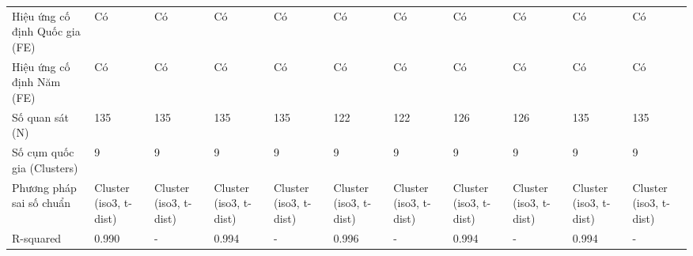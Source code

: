 \begin{table}
\begin{tabular}{lllllllllll}
Hiệu ứng cố định Quốc gia (FE) & Có & Có & Có & Có & Có & Có & Có & Có & Có & Có \\
Hiệu ứng cố định Năm (FE) & Có & Có & Có & Có & Có & Có & Có & Có & Có & Có \\
Số quan sát (N) & 135 & 135 & 135 & 135 & 122 & 122 & 126 & 126 & 135 & 135 \\
Số cụm quốc gia (Clusters) & 9 & 9 & 9 & 9 & 9 & 9 & 9 & 9 & 9 & 9 \\
Phương pháp sai số chuẩn & Cluster (iso3, t-dist) & Cluster (iso3, t-dist) & Cluster (iso3, t-dist) & Cluster (iso3, t-dist) & Cluster (iso3, t-dist) & Cluster (iso3, t-dist) & Cluster (iso3, t-dist) & Cluster (iso3, t-dist) & Cluster (iso3, t-dist) & Cluster (iso3, t-dist) \\
R-squared & 0.990 & - & 0.994 & - & 0.996 & - & 0.994 & - & 0.994 & - \\
\bottomrule
\end{tabular}
\end{table}
